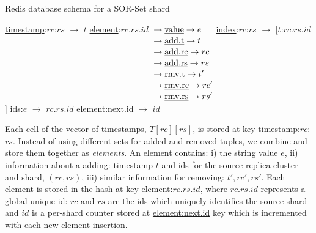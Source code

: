 \begin{algorithm}[t]
\setcounter{algorithm}{0}
\small{
	\caption{Redis database schema for a SOR-Set shard}
 	\label{lst:redis_database_schema_for_sor-set}                       
 	\begin{algorithmic}[1]
 	  \State \underline{timestamp}:$rc$:$rs$ $\rightarrow$ $t$ 
 	  \State \underline{element}:$rc.rs.id$ $\begin{aligned}[t]
                                              & \rightarrow \text{\underline{value}} \rightarrow e \\[-2pt]
                                              & \rightarrow \text{\underline{add.t}} \rightarrow t \\[-2pt]
                                              & \rightarrow \text{\underline{add.rc}} \rightarrow rc \\[-2pt]
                                              & \rightarrow \text{\underline{add.rs}} \rightarrow rs \\[-2pt]
                                              & \rightarrow \text{\underline{rmv.t}} \rightarrow t' \\[-2pt]
                                              & \rightarrow \text{\underline{rmv.rc}} \rightarrow rc' \\[-2pt]
                                              & \rightarrow \text{\underline{rmv.rs}} \rightarrow rs'
                                            \end{aligned}$ 
 	  \State \underline{index}:$rc$:$rs$ $\rightarrow$ [$t$:$rc.rs.id$] 
 	  \State \underline{ids}:$e$ $\rightarrow$ {$rc.rs.id$} 
 	  \State \underline{element:next.id} $\rightarrow$ $id$ 
	\end{algorithmic}
 }
\end{algorithm}

Each cell of the vector of timestamps, $T[rc][rs]$, is stored at key
\underline{timestamp}:$rc$:$rs$. Instead of using different sets for added and
removed tuples, we combine and store them together as \textit{elements}.
An element contains: i) the string value $e$, ii) information about a adding:
timestamp $t$ and ids for the source replica cluster and shard, $(rc, rs)$, iii)
similar information for removing: $t', rc', rs'$. Each element is stored in the
hash at key \underline{element}:$rc.rs.id$, where $rc.rs.id$ represents a global
unique id: $rc$ and $rs$ are the ids which uniquely identifies the source shard
and $id$ is a per-shard counter stored at \underline{element:next.id} key which
is incremented with each new element insertion.

